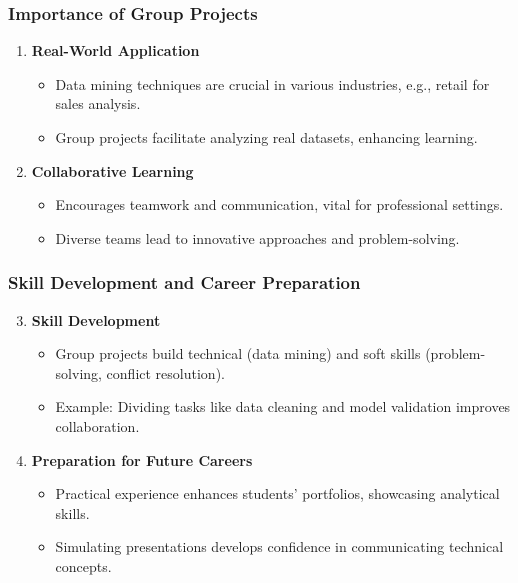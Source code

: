 \documentclass[aspectratio=169]{beamer}
\begin{document}
\begin{frame}[fragile]
    \frametitle{Importance of Group Projects}
    \begin{enumerate}
        \item \textbf{Real-World Application}
        \begin{itemize}
            \item Data mining techniques are crucial in various industries, e.g., retail for sales analysis.
            \item Group projects facilitate analyzing real datasets, enhancing learning.
        \end{itemize}
        
        \item \textbf{Collaborative Learning}
        \begin{itemize}
            \item Encourages teamwork and communication, vital for professional settings.
            \item Diverse teams lead to innovative approaches and problem-solving.
        \end{itemize}
    \end{enumerate}
\end{frame}

\begin{frame}[fragile]
    \frametitle{Skill Development and Career Preparation}
    \begin{enumerate}
        \setcounter{enumi}{2}  %
        \item \textbf{Skill Development}
        \begin{itemize}
            \item Group projects build technical (data mining) and soft skills (problem-solving, conflict resolution).
            \item Example: Dividing tasks like data cleaning and model validation improves collaboration.
        \end{itemize}
        
        \item \textbf{Preparation for Future Careers}
        \begin{itemize}
            \item Practical experience enhances students' portfolios, showcasing analytical skills.
            \item Simulating presentations develops confidence in communicating technical concepts.
        \end{itemize}
    \end{enumerate}
\end{frame}
\end{document}
